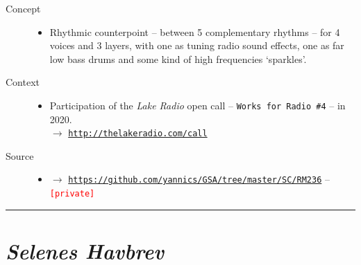 \begin{description}
\item[Concept] \hfill 
\begin{itemize}
\item[] Rhythmic counterpoint -- between 5 complementary rhythms -- for 4 voices and 3 layers, with one as tuning radio sound effects, one as far low bass drums and some kind of high frequencies `sparkles'.
\end{itemize}
\bigskip
\item[Context] \hfill 
\begin{itemize}
\item[] Participation of the \textit{Lake Radio} open call -- \texttt{Works for Radio \#4} -- in 2020. \\
$\rightarrow$ \href{http://thelakeradio.com/call}{\texttt{\small http://thelakeradio.com/call}}
\end{itemize}
\bigskip
\bigskip
\item[Source] \hfill 
\begin{itemize}
\item[] $\rightarrow$ \href{https://github.com/yannics/GSA/tree/master/SC/RM236}{\texttt{\small https://github.com/yannics/GSA/tree/master/SC/RM236}}  -- \texttt{\textcolor{red}{\small[private]}}
\end{itemize}
\end{description}

\bigskip

\begin{center}\rule{0.5\linewidth}{0.5pt}\end{center}

\bigskip


\section*{\textsl{Selenes Havbrev}}


\bigskip

